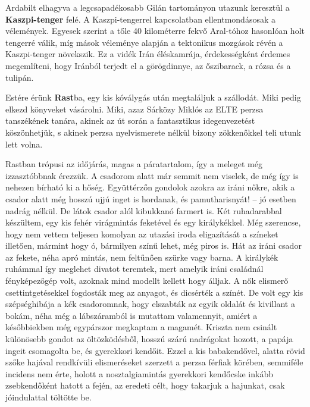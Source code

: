 Ardabilt elhagyva a legcsapadékosabb Gilán tartományon utazunk
keresztül a \textbf{Kaszpi-tenger} felé. A Kaszpi-tengerrel kapcsolatban
ellentmondásosak a vélemények. Egyesek szerint a tőle 40 kilométerre
fekvő Aral-tóhoz hasonlóan holt tengerré válik, míg mások véleménye
alapján a tektonikus mozgások révén a Kaszpi-tenger növekszik. Ez
a vidék Irán éléskamrája, érdekességként érdemes megemlíteni, hogy
Iránból terjedt el a görögdinnye, az őszibarack, a rózsa és a tulipán.

Estére érünk \textbf{Rast}ba, egy kis kóválygás után megtaláljuk a
szállodát. Miki pedig elkezd könyveket vásárolni. Miki, azaz Sárközy
Miklós az ELTE perzsa tanszékének tanára, akinek az út során a fantasztikus
idegenvezetést köszönhetjük, s akinek perzsa nyelvismerete nélkül
bizony zökkenőkkel teli utunk lett volna.

Rastban trópusi az időjárás, magas a páratartalom, így a meleget
még izzasztóbbnak érezzük. A csadorom alatt már semmit nem viselek,
de még így is nehezen bírható ki a hőség. Együttérzőn gondolok
azokra az iráni nőkre, akik a csador alatt még hosszú ujjú inget
is hordanak, és pamutharisnyát! -- jó esetben nadrág nélkül. De látok
csador alól kibukkanó farmert is. Két ruhadarabbal készültem, egy kis
fehér virágmintás feketével és egy királykékkel. Még szerencse, hogy
nem vettem teljesen komolyan az utazási iroda eligazítását a színeket
illetően, mármint hogy ó, bármilyen színű lehet, még piros is. Hát az
iráni csador az fekete, néha apró mintás, nem feltűnően szürke vagy
barna. A királykék ruhámmal így meglehet divatot teremtek, mert
amelyik iráni családnál fényképezőgép volt, azoknak mind modellt
kellett hogy álljak. A nők elismerő csettintgetésekkel fogdosták meg
az anyagot, és dicsérték a színét. De volt egy kis szépséghibája a kék
csadoromnak, hogy elszabták az egyik oldalát és kivillant a bokám,
néha még a lábszáramból is mutattam valamennyit, amiért a későbbiekben
még egypárszor megkaptam a magamét. Kriszta nem csinált
különösebb gondot az öltözködésből, hosszú szárú nadrágokat hozott,
a papája ingeit csomagolta be, és gyerekkori kendőit. Ezzel a kis babakendővel,
alatta rövid szőke hajával rendkívüli elismeréseket szerzett a
perzsa férfiak körében, semmiféle incidens nem érte, holott a nosztalgiamintás
gyerekkori kendőcske inkább zsebkendőként hatott a fején,
az eredeti célt, hogy takarjuk a hajunkat, csak jóindulattal töltötte be.

